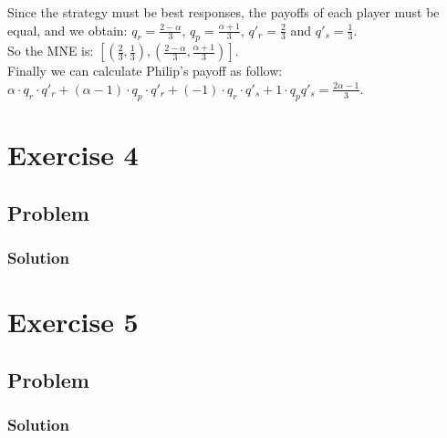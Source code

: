 \documentclass[11pt]{article}
\begin{document}
Since the strategy must be best responses, the payoffs of each player must be equal, and we obtain:  $q_r = \frac{2-\alpha}{3}$, $q_p = \frac{\alpha + 1}{3}$, $q'_r = \frac{2}{3}$ and $q'_s = \frac{1}{3}$. \\
So the MNE is: 
\(\left[\left(\frac{2}{3},\frac{1}{3}\right),\left(\frac{2-\alpha}{3},\frac{\alpha + 1}{3}\right) \right] \).\\
Finally we can calculate Philip's payoff as follow: \\ 
$\alpha \cdot q_r \cdot q'_r + (\alpha - 1) \cdot q_p \cdot q'_r + (-1) \cdot q_r \cdot q'_s + 1 \cdot q_p q'_s = \frac{2\alpha-1}{3}$.

\newpage

\section*{Exercise 4}
\subsection*{Problem}

\subsubsection*{Solution}

\newpage

\section*{Exercise 5}
\subsection*{Problem}

\subsubsection*{Solution}
\end{document}
